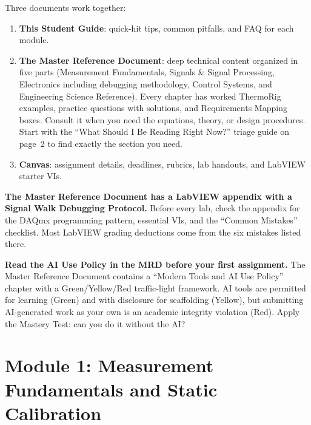 \documentclass[11pt,letterpaper]{article}
\begin{document}
\begin{faqbox}
Three documents work together:
\begin{enumerate}[leftmargin=*, itemsep=1pt, topsep=0pt]
    \item \textbf{This Student Guide}: quick-hit tips, common pitfalls, and FAQ for each module.
    \item \textbf{The Master Reference Document}: deep technical content organized in five parts (Measurement Fundamentals, Signals \& Signal Processing, Electronics including debugging methodology, Control Systems, and Engineering Science Reference). Every chapter has worked ThermoRig examples, practice questions with solutions, and Requirements Mapping boxes. Consult it when you need the equations, theory, or design procedures. Start with the ``What Should I Be Reading Right Now?'' triage guide on page~2 to find exactly the section you need.
    \item \textbf{Canvas}: assignment details, deadlines, rubrics, lab handouts, and LabVIEW starter VIs.
\end{enumerate}
\end{faqbox}

\begin{protip}
\textbf{The Master Reference Document has a LabVIEW appendix with a Signal Walk Debugging Protocol.} Before every lab, check the appendix for the DAQmx programming pattern, essential VIs, and the ``Common Mistakes'' checklist. Most LabVIEW grading deductions come from the six mistakes listed there.
\end{protip}

\begin{warnbox}
\textbf{Read the AI Use Policy in the MRD before your first assignment.} The Master Reference Document contains a ``Modern Tools and AI Use Policy'' chapter with a Green/Yellow/Red traffic-light framework. AI tools are permitted for learning (Green) and with disclosure for scaffolding (Yellow), but submitting AI-generated work as your own is an academic integrity violation (Red). Apply the Mastery Test: can you do it without the AI?
\end{warnbox}

\section{Module 1: Measurement Fundamentals and Static Calibration}
\end{document}
